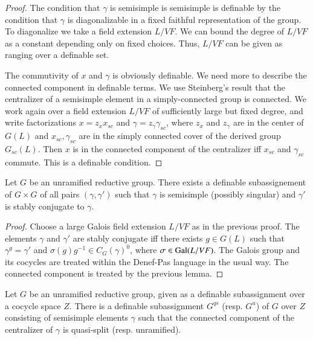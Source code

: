 \begin{proof}  The condition that $\gamma$ is semisimple is semisimple
is definable by the condition that $\gamma$ is diagonalizable in a
fixed faithful representation of the group.   To diagonalize we take a
field
extension $L/VF$.  We can bound the degree of $L/VF$ as a constant
depending only on fixed choices.  Thus, $L/VF$ can be given as ranging
over a definable set.

The commutivity of $x$ and $\gamma$ is obviously definable.  We need
more to describe the connected component in definable terms.  We use
Steinberg's result that the centralizer of a semisimple element in a
simply-connected group is connected.  We work again over a field
extension $L/VF$ of sufficiently large but fixed degree, and write
factorizations $x = z_x x_{sc}$ and $\gamma = z_\gamma \gamma_{sc}$,
where $z_x$ and $z_\gamma$ are in the center of $G(L)$ and
$x_{sc},\gamma_{sc}$ are in the simply connected cover of the derived
group $G_{sc}(L)$.  Then $x$ is in the connected component of the
centralizer iff $x_{sc}$ and $\gamma_{sc}$ commute.  This is a
definable condition.
\end{proof}

\begin{lemma} 
  Let $G$ be an unramified reductive group.  There exists a definable
  subassignement of $G\times G$ of all pairs $(\gamma,\gamma')$ such
  that $\gamma$ is semisimple (possibly singular) and $\gamma'$ is
  stably conjugate to $\gamma$.
\end{lemma}

\begin{proof} Choose a large Galois field extension $L/VF$ as in the
  previous proof.  The elements $\gamma$ and $\gamma'$ are stably
  conjugate iff there exists $g\in G(L)$ such that
  $\gamma^g = \gamma'$ and $\sigma(g)g^{-1} \in C_G(\gamma)^0$, where
  $\sigma\in {\operatorname{Gal}}(L/VF)$.  The Galois group and its cocycles are
  treated within the Denef-Pas language in the usual way.  The
  connected component is treated by the previous lemma.
\end{proof}

\begin{lemma} 
  Let $G$ be an unramified reductive group, given as a definable
  subassignment over a cocycle space $Z$.  There is a definable
  subassignment $G^{qs}$ (resp. $G^u$) of $G$ over $Z$ consisting of 
  semisimple elements $\gamma$ such that the connected component of
  the centralizer of $\gamma$ is quasi-split (resp. unramified).
\end{lemma}

